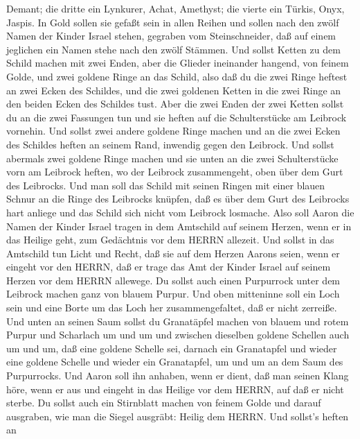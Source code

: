 Demant;  die dritte ein Lynkurer, Achat, Amethyst;
 die vierte ein Türkis, Onyx, Jaspis. In Gold sollen sie
gefaßt sein in allen Reihen  und sollen nach den zwölf
Namen der Kinder Israel stehen, gegraben vom Steinschneider, daß auf
einem jeglichen ein Namen stehe nach den zwölf Stämmen. 
Und sollst Ketten zu dem Schild machen mit zwei Enden, aber die Glieder
ineinander hangend, von feinem Golde,  und zwei goldene
Ringe an das Schild, also daß du die zwei Ringe heftest an zwei Ecken
des Schildes,  und die zwei goldenen Ketten in die zwei
Ringe an den beiden Ecken des Schildes tust.  Aber die zwei
Enden der zwei Ketten sollst du an die zwei Fassungen tun und sie heften
auf die Schulterstücke am Leibrock vornehin.  Und sollst
zwei andere goldene Ringe machen und an die zwei Ecken des Schildes
heften an seinem Rand, inwendig gegen den Leibrock.  Und
sollst abermals zwei goldene Ringe machen und sie unten an die zwei
Schulterstücke vorn am Leibrock heften, wo der Leibrock zusammengeht,
oben über dem Gurt des Leibrocks.  Und man soll das Schild
mit seinen Ringen mit einer blauen Schnur an die Ringe des Leibrocks
knüpfen, daß es über dem Gurt des Leibrocks hart anliege und das Schild
sich nicht vom Leibrock losmache.  Also soll Aaron die
Namen der Kinder Israel tragen in dem Amtschild auf seinem Herzen, wenn
er in das Heilige geht, zum Gedächtnis vor dem HERRN allezeit.
 Und sollst in das Amtschild tun Licht und Recht, daß sie
auf dem Herzen Aarons seien, wenn er eingeht vor den HERRN, daß er trage
das Amt der Kinder Israel auf seinem Herzen vor dem HERRN allewege.
 Du sollst auch einen Purpurrock unter dem Leibrock machen
ganz von blauem Purpur.  Und oben mitteninne soll ein Loch
sein und eine Borte um das Loch her zusammengefaltet, daß er nicht
zerreiße.  Und unten an seinen Saum sollst du Granatäpfel
machen von blauem und rotem Purpur und Scharlach um und um und zwischen
dieselben goldene Schellen auch um und um,  daß eine
goldene Schelle sei, darnach ein Granatapfel und wieder eine goldene
Schelle und wieder ein Granatapfel, um und um an dem Saum des
Purpurrocks.  Und Aaron soll ihn anhaben, wenn er dient,
daß man seinen Klang höre, wenn er aus und eingeht in das Heilige vor
dem HERRN, auf daß er nicht sterbe.  Du sollst auch ein
Stirnblatt machen von feinem Golde und darauf ausgraben, wie man die
Siegel ausgräbt: Heilig dem HERRN.  Und sollst's heften an
